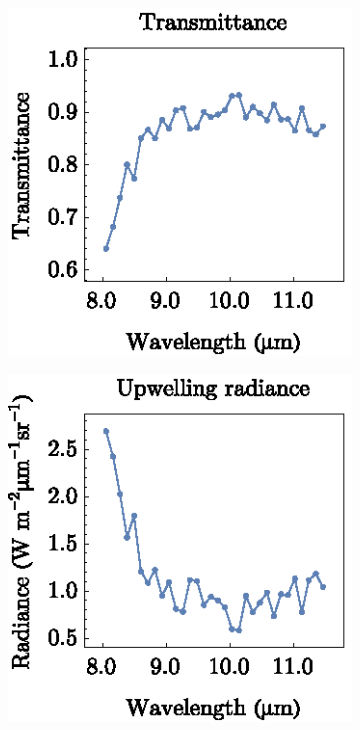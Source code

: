 \begin{figure}[htb]
	\centering
	\vspace{1em}
	\begin{subfigure}[t]{.3\linewidth}
		\centering
		\includegraphics[scale=1]{pics/Chapter_02/Transmittance.eps}
		\vspace{-0.4cm}
		\caption{}
	\end{subfigure}
	\hspace{1em}
	\begin{subfigure}[t]{.3\linewidth}
		\centering
		\includegraphics[scale=1]{pics/Chapter_02/Upwelling.eps}
		\vspace{-0.4cm}
		\caption{}
	\end{subfigure}

\end{figure}
